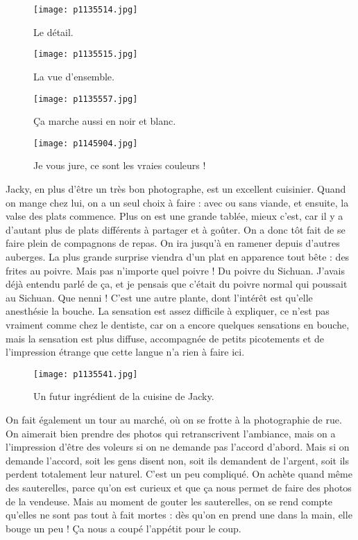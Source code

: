 \documentclass{book}
\begin{document}
\begin{figure}[h]
\centering
\texttt{[image: p1135514.jpg]}
\caption*{Le détail.}
\end{figure}


\begin{figure}[h]
\centering
\texttt{[image: p1135515.jpg]}
\caption*{La vue d'ensemble.}
\end{figure}


\begin{figure}[h]
\centering
\texttt{[image: p1135557.jpg]}
\caption*{Ça marche aussi en noir et blanc.}
\end{figure}


\begin{figure}[h]
\centering
\texttt{[image: p1145904.jpg]}
\caption*{Je vous jure, ce sont les vraies couleurs !}
\end{figure}

Jacky, en plus d'être un très bon photographe, est un excellent cuisinier. Quand on mange chez lui, on a un seul choix à faire : avec ou sans viande, et ensuite, la valse des plats commence. Plus on est une grande tablée, mieux c'est, car il y a d'autant plus de plats différents à partager et à goûter. On a donc tôt fait de se faire plein de compagnons de repas. On ira jusqu'à en ramener depuis d'autres auberges. La plus grande surprise viendra d'un plat en apparence tout bête : des frites au poivre. Mais pas n'importe quel poivre ! Du poivre du Sichuan. J'avais déjà entendu parlé de ça, et je pensais que c'était du poivre normal qui poussait au Sichuan. Que nenni ! C'est une autre plante, dont l'intérêt est qu'elle anesthésie la bouche. La sensation est assez difficile à expliquer, ce n'est pas vraiment comme chez le dentiste, car on a encore quelques sensations en bouche, mais la sensation est plus diffuse, accompagnée de petits picotements et de l'impression étrange que cette langue n'a rien à faire ici.


\begin{figure}[h]
\centering
\texttt{[image: p1135541.jpg]}
\caption*{Un futur ingrédient de la cuisine de Jacky.}
\end{figure}

On fait également un tour au marché, où on se frotte à la photographie de rue. On aimerait bien prendre des photos qui retranscrivent l'ambiance, mais on a l'impression d'être des voleurs si on ne demande pas l'accord d'abord. Mais si on demande l'accord, soit les gens disent non, soit ils demandent de l'argent, soit ils perdent totalement leur naturel. C'est un peu compliqué. On achète quand même des sauterelles, parce qu'on est curieux et que ça nous permet de faire des photos de la vendeuse. Mais au moment de gouter les sauterelles, on se rend compte qu'elles ne sont pas tout à fait mortes : dès qu'on en prend une dans la main, elle bouge un peu ! Ça nous a coupé l'appétit pour le coup.
\end{document}
